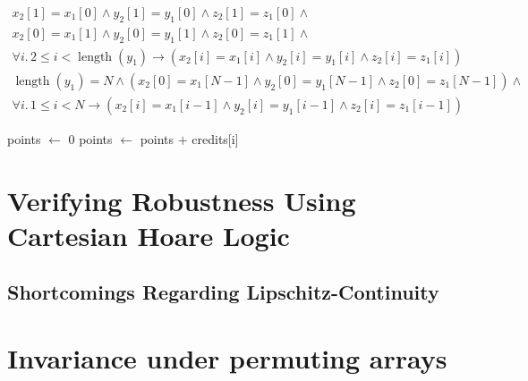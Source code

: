 \documentclass{llncs}
\DeclareMathOperator{\Perm}{Perm}
\DeclareMathOperator{\len}{length}
\begin{document}
\begin{multline*}x_{2}[1] = x_{1}[0] \wedge y_{2}[1] = y_{1}[0] \wedge z_{2}[1] = z_{1}[0] \wedge\\
x_{2}[0] = x_{1}[1] \wedge y_{2}[0] = y_{1}[1] \wedge z_{2}[0] = z_{1}[1] \wedge\\
\forall i.\, 2 \leq i < \len(y_{1}) \rightarrow (x_{2}[i] = x_{1}[i] \wedge y_{2}[i] = y_{1}[i] \wedge z_{2}[i] = z_{1}[i])
\end{multline*}
\begin{multline*}\len(y_{1}) = N \wedge (x_{2}[0] = x_{1}[N-1] \wedge y_{2}[0] = y_{1}[N-1] \wedge z_{2}[0] = z_{1}[N-1]) \wedge\\ \forall i.\, 1 \leq i < N \rightarrow (x_{2}[i] = x_{1}[i-1] \wedge y_{2}[i] = y_{1}[i-1] \wedge z_{2}[i] = z_{1}[i-1])
\end{multline*}

\begin{algorithm}
\begin{algorithmic}
\State points \(\gets\) 0
\State points \(\gets\) points \(+\) credits[i]
\EndIf
\EndFor
{}
\EndFunction
\end{algorithmic}
\end{algorithm}

\section{Verifying Robustness Using Cartesian Hoare Logic}


\subsection{Shortcomings Regarding Lipschitz-Continuity}


\section{Invariance under permuting arrays}
\end{document}
